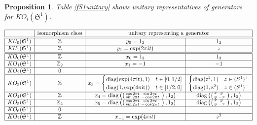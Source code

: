 \documentclass[12pt, reqno]{amsart}
\newtheorem{prop}[thm]{Proposition}
\theoremstyle{definition}
\def\Z{{\mathbb Z}}
\def\crr{^{\scriptscriptstyle {\it CR}}}
\def\diag{\rm{diag}}
\newcommand{\fS}{\mathfrak S}
\begin{document}
\vspace{2cm}

\begin{prop}
Table \ref{fS1unitary} shows unitary representatives of generators for $KO_i(\fS^1)$.
\end{prop}

\begin{table} 
\caption{Unitaries for $K\crr(\fS^1)$} \label{fS1unitary}
$$\begin{array}{|c|c| c|c|}  \hline
  & \text{isomorphism class} & 
 	\multicolumn{2}{|c|}{ \text{unitary representing a generator}}  \\ \hline \hline
 KU_0( \fS^1) & \Z & y_0 = 1_2 &  1_2 \\ \hline
 KU_1(\fS^1) & \Z & y_1 = \exp(2 \pi i t)  &  z \\ \hline \hline
KO_0(\fS^1) & \Z & x_{0} = 1_2 & 1_2  \\ \hline 
KO_1(\fS^1) & \Z_2 & x_{1} = -1 & -1  \\ \hline
KO_2(\fS^1) & 0 &&  \\ \hline 
KO_3(\fS^1) & \Z & x_3 = \begin{cases} \diag(\exp({4 \pi i t}), 1) &t \in [0, 1/2] \\
				\diag(1, \exp({4 \pi i t}))  & t \in [1/2, 0] \end{cases} 
&  \begin{cases} \diag(z^2, 1) &z \in (S^1)^+\\
				\diag(1, z^2) &z \in (S^1)^- \end{cases}   \\ \hline
KO_4(\fS^1) & \Z & 
	x_4 = \diag \left( \left(  \begin{smallmatrix} \cos 2 \pi t & \sin 2 \pi t   \\ \sin 2 \pi t & -\cos 2 \pi t &   \end{smallmatrix} \right) , 1_2 \right) & 
	 \diag \left( \left(  \begin{smallmatrix} x & y   \\ y & -x &   \end{smallmatrix} \right) , 1_2 \right) \\ \hline  
KO_5(\fS^1) & \Z_2 & 
	x_5 = \diag \left( \left(  \begin{smallmatrix} \cos 2 \pi t & \sin 2 \pi t   \\ \sin 2 \pi t & -\cos 2 \pi t &   \end{smallmatrix} \right) , 1_2 \right) & 
	 \diag \left( \left(  \begin{smallmatrix} x & y   \\ y & -x &   \end{smallmatrix} \right) , 1_2 \right) \\ \hline  
KO_6(\fS^1) & 0 &&  \\ \hline 
KO_{7}(\fS^1) & \Z & x_{-1} = \exp(4 \pi i t) &  z^2   \\ \hline 
\end{array}$$

\end{table}
\end{document}
